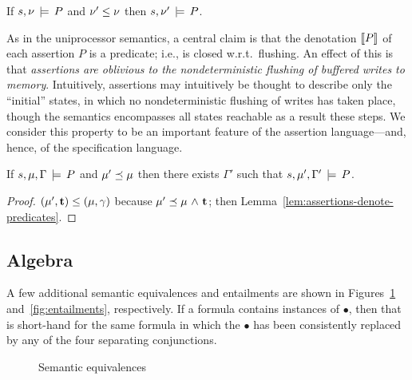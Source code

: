 \documentclass[11pt]{report}
\begin{document}
\begin{lemma}
    \label{lem:assertions-denote-predicates2}
    If $s,\nu \,\models\, P$ and $\nu' \leq \nu$ then $s,\nu' \,\models\, P$. 
\end{lemma}

As in the uniprocessor semantics, a central claim is that the denotation $[\![P]\!]$ of each assertion $P$ is a predicate; i.e., is closed w.r.t.~flushing. An effect of this is that \emph{assertions are oblivious to the nondeterministic flushing of buffered writes to memory}. Intuitively, assertions may intuitively be thought to describe only the ``initial'' states, in which no nondeterministic flushing of writes has taken place, though the semantics encompasses all states reachable as a result these steps. We consider this property to be an important feature of the assertion language---and, hence, of the specification language. 

\begin{corollary}
  \label{lem:flushing-closure}
  If $s,\mu,\Gamma \,\models\, P$ and $\mu' \preceq \mu$ then there exists $\Gamma'$ such that $s,\mu',\Gamma' \,\models\, P$. 
\end{corollary}

\begin{proof}
$(\mu',\mathbf{t}) \leq (\mu,\gamma)$ because $\mu' \preceq \mu \operatorname{\,\wedge\,} \mathbf{t}$; then Lemma~\ref{lem:assertions-denote-predicates}. 
\end{proof}

\subsection{Algebra}
\label{sec:algebra}

A few additional semantic equivalences and entailments are shown in Figures~\ref{fig:equivalences} and~\ref{fig:entailments}, respectively. If a formula contains instances of $\bullet$, then that is short-hand for the same formula in which the $\bullet$ has been consistently replaced by any of the four separating conjunctions. 

\begin{figure}[ht]
	\centering
	\caption{\label{fig:equivalences}Semantic equivalences}
\end{figure}
\end{document}
